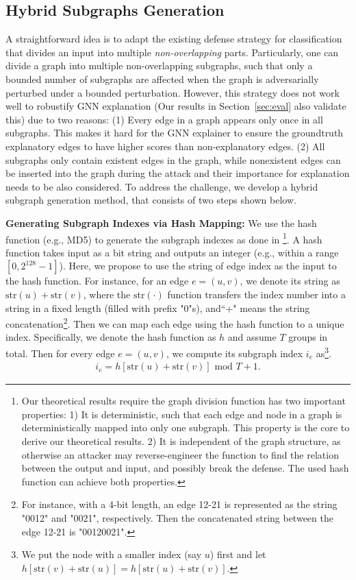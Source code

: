 \subsection{Hybrid Subgraphs Generation}
\label{sec:Hybrid}
A straightforward idea is to adapt the existing defense strategy for  classification~\citep{levine2020randomized,xiang2021patchguard, jia2021intrinsic,jia2022certified,xia2024gnncert} that divides an input into multiple \emph{non-overlapping} parts. 
Particularly, one can divide a graph into multiple non-overlapping subgraphs, such that only a bounded number of  subgraphs are affected when the graph is adversarially perturbed under a bounded perturbation. 
However, this strategy does not work well to robustify GNN explanation (Our results in Section~\ref{sec:eval} also validate this) due to two reasons: 
(1) Every edge in a graph appears only once in all subgraphs. This  makes it hard for the GNN explainer to ensure the groundtruth explanatory edges to have higher scores than non-explanatory edges. 
(2) All subgraphs only contain existent edges in the graph, while nonexistent edges can be inserted into the graph during the attack and their importance for explanation needs to be also considered. 
To address the challenge, we develop a hybrid subgraph generation method, that consists of two steps shown below.  

{\bf Generating Subgraph Indexes via Hash Mapping:} 
We use the hash function (e.g., MD5) to generate the subgraph indexes {as done in \citet{xia2024gnncert,yang2024distributed}}\footnote{Our theoretical results require the graph division function has two important properties: 1) It is deterministic, such that each edge and node in a graph is deterministically mapped into only one subgraph. This property is the core to derive our theoretical results.  2) It is independent of the graph structure, as otherwise an attacker may reverse-engineer the function to find the relation between the output and input, and possibly break the defense. The used hash function can achieve both properties.}. A hash function takes input as a bit string and outputs an integer (e.g., within a range $[0,2^{128}-1]$). Here, we propose to use the string of edge index as the input to the hash function. For instance, for an edge $e=(u,v)$, we denote its string as $\textrm{str}(u)+\textrm{str}(v)$, where {the $\textrm{str}(\cdot)$ function  transfers the index number into a string in a fixed length (filled with prefix "0"s)}, and``+" means the string concatenation\footnote{For instance, with a 4-bit length, an edge 12-21 is represented as the string "0012" and "0021", respectively. Then the concatenated string between the edge 12-21 is "00120021".}. 
Then we can map each edge using the hash function to a unique index.
Specifically, we denote the hash function as $h$ and assume $T$ groups 
in total. Then for every edge $e=(u,v)$, we compute its subgraph index $i_e$ as\footnote{We put the node with a smaller index (say  $u$) first and let 
$h[\mathrm{str}(v) + \mathrm{str}(u)]=h[\mathrm{str}(u) + \mathrm{str}(v)]$.}. 
\begin{align}
\label{eqn:hashidx}
i_e = h[\mathrm{str}(u) + \mathrm{str}(v)] \, \, \mathrm{mod} \, \, T+1. 
\end{align}


